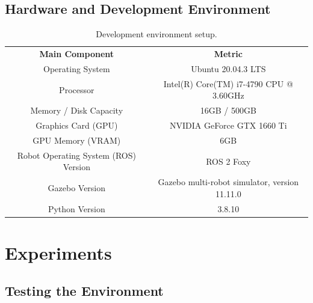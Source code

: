 \documentclass[12pt,oneside]{article}
\begin{document}
\subsection{Hardware and Development Environment} 

\begin{table}[H]
\centering
\begin{tabular}{ | c | c | }
\hline
\rowcolor{gray!50}
\multicolumn{2}{|c|}{\textbf{Environment Setup}} \\
\hline
\rowcolor{gray!25}
\textbf{Main Component} & \textbf{Metric} \\
\hline
Operating System & Ubuntu 20.04.3 LTS \\
\rowcolor{gray!10}
Processor & Intel(R) Core(TM) i7-4790 CPU @ 3.60GHz \\
Memory / Disk Capacity & 16GB / 500GB \\
\rowcolor{gray!10}
Graphics Card (GPU) & NVIDIA GeForce GTX 1660 Ti \\
GPU Memory (VRAM) & 6GB \\
\rowcolor{gray!10}
Robot Operating System (ROS) Version & ROS 2 Foxy \\
Gazebo Version & Gazebo multi-robot simulator, version 11.11.0 \\
\rowcolor{gray!10}
Python Version & 3.8.10 \\

\hline
\end{tabular}
\caption{Development environment setup.}
\label{table:hardware-specs}
\end{table}





\section{Experiments}\label{experiments}
\subsection{Testing the Environment}\label{experiment:testing-the-environment}
\end{document}

